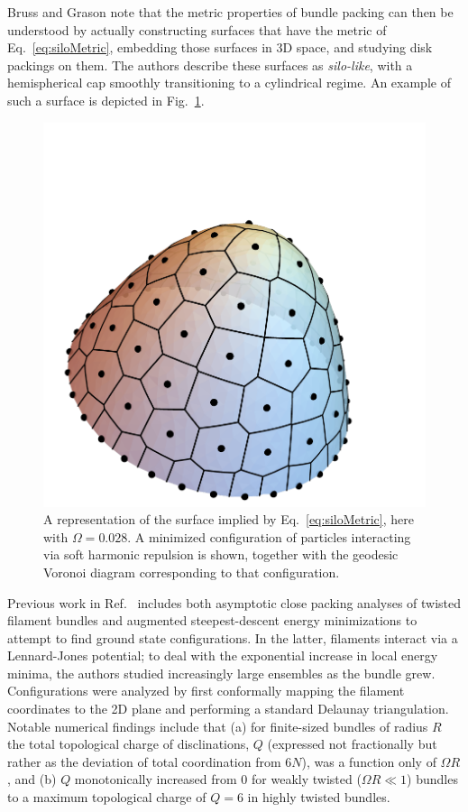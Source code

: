 \documentclass[preprint,12pt]{elsarticle}
\begin{document}
Bruss and Grason note that the metric properties of bundle packing can then be understood by actually constructing surfaces that have the metric of Eq.~\ref{eq:siloMetric}, embedding those surfaces in 3D space, and studying disk packings on them.
The authors describe these surfaces as \emph{silo-like}, with a hemispherical cap smoothly transitioning to a cylindrical regime.
An example of such a surface is depicted in Fig.~\ref{fig:siloMeshPicture}.

\begin{figure}
    \centering
    \includegraphics[width=1.0\linewidth]{82_omega028_18.pdf}
\caption{A representation of the surface implied by Eq.~\ref{eq:siloMetric}, here with $\Omega=0.028$. A minimized configuration of particles interacting via soft harmonic repulsion is shown, together with the geodesic Voronoi diagram corresponding to that configuration.}
    \label{fig:siloMeshPicture}
\end{figure}

Previous work in Ref.~\cite{bruss2012non} includes both asymptotic close packing analyses of twisted filament bundles and augmented steepest-descent energy minimizations to attempt to find ground state configurations. In the latter, filaments interact via a Lennard-Jones potential; to deal with the exponential increase in local energy minima, the authors studied increasingly large ensembles as the bundle grew.
Configurations were analyzed by first conformally mapping the filament coordinates to the 2D plane and performing a standard Delaunay triangulation.
Notable numerical findings include that (a) for finite-sized bundles of radius $R$ the total topological charge of disclinations, $Q$ (expressed not fractionally but rather as the deviation of total coordination from $6N$), was a function only of $\Omega R$, and (b) $Q$ monotonically increased from 0 for weakly twisted ($\Omega R \ll 1$) bundles to a maximum topological charge of $Q=6$ in highly twisted bundles. 
\end{document}

